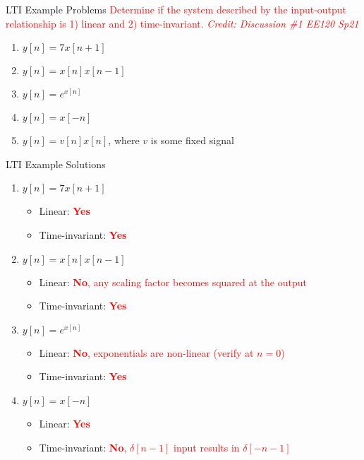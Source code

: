 \begin{frame}{LTI Example Problems}
    \textcolor{red}{Determine if the system described by the input-output relationship is 1) linear and 2) time-invariant. {\footnotesize\textit{Credit: Discussion \#1 EE120 Sp21}}}
    \begin{enumerate}
        \item $y[n] = 7x[n+1]$
        \item $y[n] = x[n]x[n-1]$
        \item $y[n] = e^{x[n]}$
        \item $y[n] = x[-n]$
        \item $y[n] = v[n]x[n]$, where $v$ is some fixed signal
    \end{enumerate}
\end{frame}

\begin{frame}{LTI Example Solutions}
    \begin{enumerate}
        \item $y[n] = 7x[n+1]$
        \begin{itemize}
            \item Linear: \textcolor{red}{\textbf{Yes}}
            \item Time-invariant: \textcolor{red}{\textbf{Yes}}
        \end{itemize}
        \item $y[n] = x[n]x[n-1]$
        \begin{itemize}
            \item Linear: \textcolor{red}{\textbf{No}, any scaling factor becomes squared at the output}
            \item Time-invariant: \textcolor{red}{\textbf{Yes}}
        \end{itemize}
        \item $y[n] = e^{x[n]}$
        \begin{itemize}
            \item Linear: \textcolor{red}{\textbf{No}, exponentials are non-linear (verify at $n=0$)}
            \item Time-invariant: \textcolor{red}{\textbf{Yes}}
        \end{itemize}
        \item $y[n] = x[-n]$
        \begin{itemize}
            \item Linear: \textcolor{red}{\textbf{Yes}}
            \item Time-invariant: \textcolor{red}{\textbf{No}, $\delta[n-1]$ input results in $\delta[-n-1]$}

\end{itemize}
\end{enumerate}
\end{frame}
